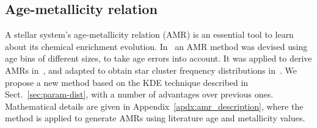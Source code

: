 \documentclass{aa}
\begin{document}



\subsection{Age-metallicity relation}
\label{ssec:amr}

A stellar system's age-metallicity relation (AMR) is an essential tool to learn
about its chemical enrichment evolution.
%
In~\cite{Piatti_2010_AMR} an AMR method was devised using age bins of different
sizes, to take age errors into account. It was applied to derive AMRs
in~\cite{Piatti_Geisler_2013}, and adapted to obtain star cluster frequency
distributions in~\cite{Piatti_2013_CF}.
%
We propose a new method based on the KDE technique described in
Sect.~\ref{sec:param-dist}, with a number of advantages over previous ones.
Mathematical details are given in Appendix~\ref{apdx:amr_description}, where
the method is applied to generate AMRs using literature age and metallicity
values.
\end{document}
